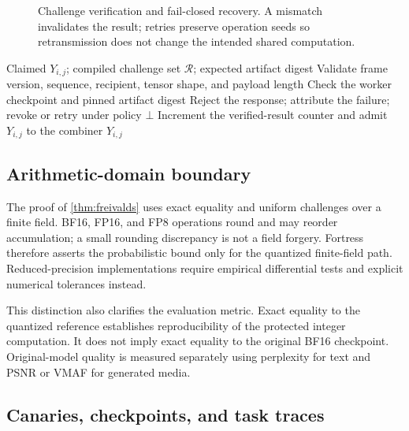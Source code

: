\begin{figure}[htbp]
\centering

\caption{Challenge verification and fail-closed recovery. A mismatch invalidates the result; retries preserve operation seeds so retransmission does not change the intended shared computation.}
\label{fig:freivalds}
\end{figure}

\begin{algorithm}[htbp]
\caption{Verified role result}
\label{alg:verify}
\begin{algorithmic}[1]
\Require Claimed $Y_{i,j}$; compiled challenge set $\mathcal{R}$; expected artifact digest
\State Validate frame version, sequence, recipient, tensor shape, and payload length
\State Check the worker checkpoint and pinned artifact digest
    \State Reject the response; attribute the failure; revoke or retry under policy
    \State \Return $\bot$
  \EndIf
\EndFor
\State Increment the verified-result counter and admit $Y_{i,j}$ to the combiner
\State \Return $Y_{i,j}$
\end{algorithmic}
\end{algorithm}

\subsection{Arithmetic-domain boundary}

\begin{securitybox}
The proof of \cref{thm:freivalds} uses exact equality and uniform challenges over a finite field. BF16, FP16, and FP8 operations round and may reorder accumulation; a small rounding discrepancy is not a field forgery. Fortress therefore asserts the probabilistic bound only for the quantized finite-field path. Reduced-precision implementations require empirical differential tests and explicit numerical tolerances instead.
\end{securitybox}

This distinction also clarifies the evaluation metric. Exact equality to the quantized reference establishes reproducibility of the protected integer computation. It does not imply exact equality to the original BF16 checkpoint. Original-model quality is measured separately using perplexity for text and PSNR or VMAF for generated media.

\subsection{Canaries, checkpoints, and task traces}

